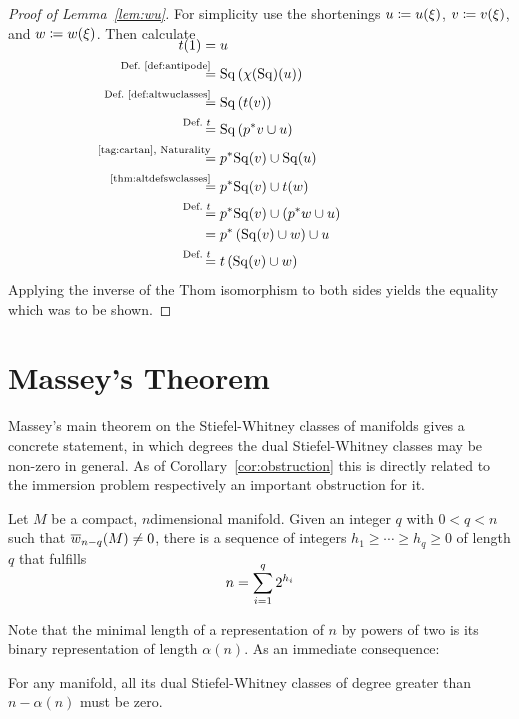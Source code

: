 \begin{proof}[Proof of Lemma~\ref{lem:wu}]
  For simplicity use the shortenings
  $u\coloneqq {u}(\xi)$,
  $v\coloneqq {v}(\xi)$, and
  $w\coloneqq {w}(\xi)$.
  Then calculate
  \begin{align*}
    \SwapAboveDisplaySkip
    \thomiso(1)
    &= \U
    \\
    &\equalsby{Def.~\ref{def:antipode}}
      \SQ\left(\antipode(\SQ)(\U)\right)
    \\
    &\equalsby{Def.~\ref{def:altwuclasses}}
      \SQ\left(\thomiso(\Vu)\right)
    \\
    &\equalsby{Def.~$\thomiso$}
      \SQ\left(\pb p\Vu \cup \U\right)
    \\
    &\equalsby{\ref{tag:cartan}, Naturality}
      \pb p\SQ(\Vu) \cup \SQ(\U)
    \\
    &\equalsby{\ref{thm:altdefswclasses}}
      \pb p\SQ(\Vu) \cup \thomiso(\Ws)
    \\
    &\equalsby{Def.~$\thomiso$}
      \pb p\SQ(\Vu) \cup \left(\pb p \Ws \cup \U\right)
    \\
    &=
      \pb p\left(\SQ(\Vu) \cup \Ws\right) \cup \U
    \\
    &\equalsby{Def.~$\thomiso$}
      \thomiso\left(\SQ(\Vu) \cup \Ws\right)
  \end{align*}
  Applying the inverse of the Thom isomorphism to both sides
  yields the equality which was to be shown.
\end{proof}


\section{Massey's Theorem}
\label{sec:massey}
Massey's main theorem on the Stiefel-Whitney classes of manifolds
\cite[Theorem~I.]{massey} gives a concrete statement, in which degrees
the dual Stiefel-Whitney classes may be non-zero in general.
As of Corollary~\ref{cor:obstruction} this is directly related to the
immersion problem respectively an important obstruction for it.
\begin{Thm}[Massey]\label{thm:massey}  
  Let $M$ be a compact, $n$\nbd{}dimensional manifold.
  Given an integer $q$ with $0<q<n$ such that ${\overline{w}_{n-q}}(M)\neq0$,
  there is a sequence of integers $h_1\geq\dotsb\geq h_q\geq0$ of
  length $q$ that fulfills
  \begin{gather*}
    \SwapAboveDisplaySkip
    n = \sum_{i=1}^{q} 2^{h_i}
  \end{gather*}
\end{Thm}
Note that the minimal length of a representation of $n$ by
powers of two is its binary representation of length $\alpha(n)$.
As an immediate consequence:
\begin{Cor}
  For any manifold, all its dual Stiefel-Whitney classes of degree
  greater than $n-\alpha(n)$ must be zero.
\end{Cor}

